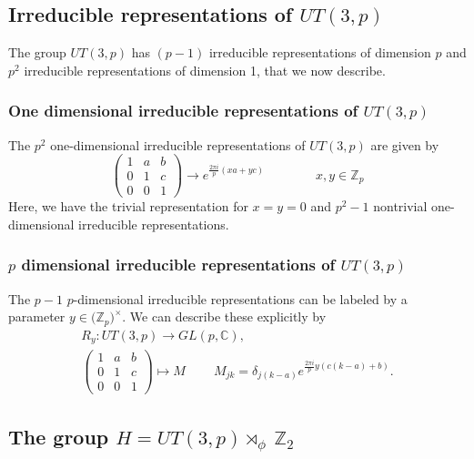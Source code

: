 \documentclass[12pt]{article}
\theoremstyle{definition}
\newcommand{\be}{\begin{equation}}
\newcommand{\ee}{\end{equation}}
\begin{document}
\subsection{Irreducible representations of $UT(3,p)$}

The group $UT(3,p)$ has $(p-1)$ irreducible representations of dimension $p$ and $p^2$ irreducible representations of dimension 1, that we now describe.

\subsubsection*{One dimensional irreducible representations of $UT(3,p)$}
The $p^2$ one-dimensional irreducible representations of $UT(3,p)$ are given by
\be
\label{RUT}
\begin{pmatrix}
1 & a & b \\
0 & 1 & c \\
0 & 0 & 1
\end{pmatrix}
\to e^{\frac{2 \pi i}{p} (x a + y c)} \qquad \qquad x,y \in \mathbb{Z}_p
\ee
Here, we have the trivial representation for $x=y=0$ and $p^2-1$ nontrivial one-dimensional irreducible representations.

\subsubsection*{$p$ dimensional irreducible representations of $UT(3,p)$}

The $p-1$ $p$-dimensional irreducible representations can be labeled by a parameter $y \in \big(\mathbb{Z}_p\big)^{\times}$. We can describe these explicitly by
\begin{equation}
\begin{gathered}
R_y: UT(3,p) \rightarrow GL(p, \mathbb{C}),\\
\begin{pmatrix}
1 & a & b \\
0 & 1 & c \\
0 & 0 & 1
\end{pmatrix}
\mapsto M \qquad ~M_{jk} = \delta_{j (k - a)} e^{\frac{2 \pi i}{p} y (c(k-a)+b)}.
\end{gathered}
\end{equation}

\subsection{The group $H = UT(3,p) \rtimes_{\phi}~\mathbb{Z}_2$}
\end{document}
